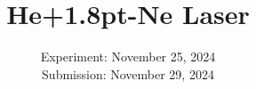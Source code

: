 

\usepackage{xspace}
\usepackage{makecell}
\newcommand{\HeNe}{He\texorpdfstring{\kern+1.2pt}{}-Ne\xspace}

\publishers{TU Dortmund – Department of Physics}

\subject{\texorpdfstring{\vspace{2ex}}{}V61\texorpdfstring{\vspace{-2ex}}{}} %
\title{He\texorpdfstring{\kern+1.8pt}{}-Ne Laser} %
\date{
	Experiment: November 25, 2024 %
	\\ Submission: November 29, 2024 %
}




\maketitle
\thispagestyle{empty}

\tableofcontents
\newpage








\printbibliography{}

%


